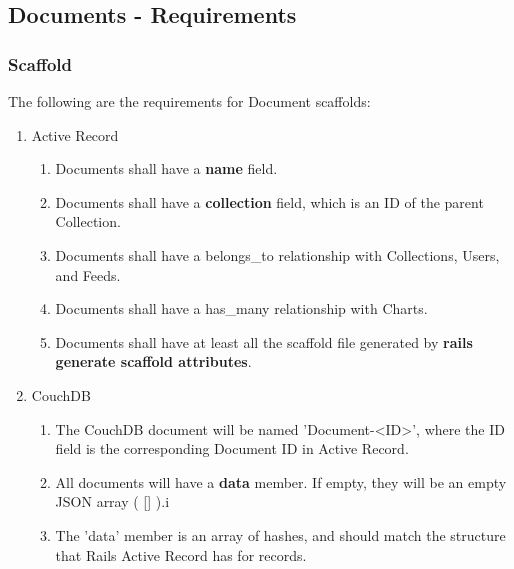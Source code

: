 \subsection{Documents - Requirements}
\label{sec:document_spec} 

\subsubsection{Scaffold}
The following are the requirements for Document scaffolds:
\begin{enumerate}
	\item Active Record
	\begin{enumerate}
		\item Documents shall have a \textbf{name} field.
		\item Documents shall have a \textbf{collection} field, which is an ID 
			of the parent Collection.
		\item Documents shall have a belongs\_to relationship with Collections,
			Users, and Feeds.
		\item Documents shall have a has\_many relationship with Charts.
		\item Documents shall have at least all the scaffold file generated by
			\textbf{rails generate scaffold attributes}.
	\end{enumerate}

	\item CouchDB
	\begin{enumerate}
		\item The CouchDB document will be named 'Document-<ID>', where the
			ID field is the corresponding Document ID in Active Record.
		\item All documents will have a \textbf{data} member. If empty, they
			will be an empty JSON array ( [] ).i
		\item The 'data' member is an array of hashes, and should match the
			structure that Rails Active Record has for records.
	\end{enumerate}
\end{enumerate}

